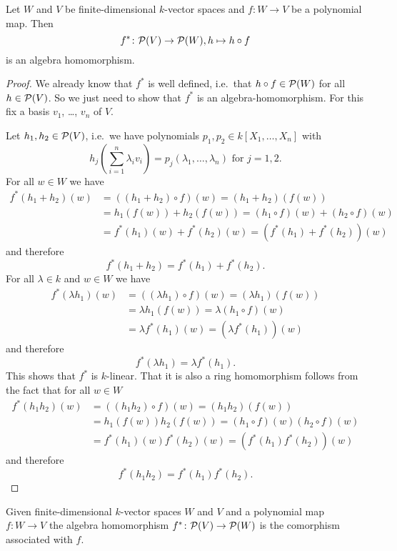 \begin{lem}
 Let $W$ and $V$ be finite-dimensional $k$-vector spaces and $f \colon W \to V$ be a polynomial map. Then
 \[
  f^* \colon \mathcal{P}(V) \to \mathcal{P}(W), h \mapsto h \circ f
 \]
 is an algebra homomorphism.
\end{lem}
\begin{proof}
 We already know that $f^*$ is well defined, i.e.\ that $h \circ f \in \mathcal{P}(W)$ for all $h \in \mathcal{P}(V)$. So we just need to show that $f^*$ is an algebra-homomorphism. For this fix a basis $v_1$, \dots, $v_n$ of $V$.
 
 Let $h_1, h_2\in \mathcal{P}(V)$, i.e.\ we have polynomials $p_1, p_2\in k[X_1, \dotsc, X_n]$ with
 \[
  h_j\left(\sum_{i=1}^n \lambda_i v_i\right) = p_j(\lambda_1, \dotsc, \lambda_n) \text{ for } j=1,2.
 \]
 For all $w \in W$ we have
 \begin{align*}
  f^*(h_1+h_2)(w)
  &= ((h_1 + h_2) \circ f)(w)
  = (h_1 + h_2)(f(w)) \\
  &= h_1(f(w)) + h_2(f(w))
  = (h_1 \circ f)(w) + (h_2 \circ f)(w) \\
  &= f^*(h_1)(w) + f^*(h_2)(w)
  = (f^*(h_1)+f^*(h_2))(w)
 \end{align*}
 and therefore
 \[
  f^*(h_1+h_2) = f^*(h_1) + f^*(h_2).
 \]
 For all $\lambda \in k$ and $w \in W$ we have
 \begin{align*}
  f^*(\lambda h_1)(w)
  &= ((\lambda h_1) \circ f)(w)
  = (\lambda h_1)(f(w)) \\
  &= \lambda h_1(f(w))
  = \lambda (h_1 \circ f)(w) \\
  &= \lambda f^*(h_1)(w)
  = (\lambda f^*(h_1))(w)
 \end{align*}
 and therefore
 \[
  f^*(\lambda h_1) = \lambda f^*(h_1).
 \]
 This shows that $f^*$ is $k$-linear. That it is also a ring homomorphism follows from the fact that for all $w \in W$
 \begin{align*}
  f^*(h_1 h_2)(w)
  &= ((h_1 h_2) \circ f)(w)
  = (h_1 h_2)(f(w)) \\
  &= h_1(f(w)) h_2(f(w))
  = (h_1 \circ f)(w) (h_2 \circ f)(w) \\
  &= f^*(h_1)(w) f^*(h_2)(w)
  = (f^*(h_1) f^*(h_2))(w)
 \end{align*}
 and therefore
 \[
  f^*(h_1 h_2) = f^*(h_1) f^*(h_2).
 \]
\end{proof}


\begin{defi}
 Given finite-dimensional $k$-vector spaces $W$ and $V$ and a polynomial map $f \colon W \to V$ the algebra homomorphism $f^* \colon \mathcal{P}(V) \to \mathcal{P}(W)$ is the comorphism associated with $f$.
\end{defi}
 


